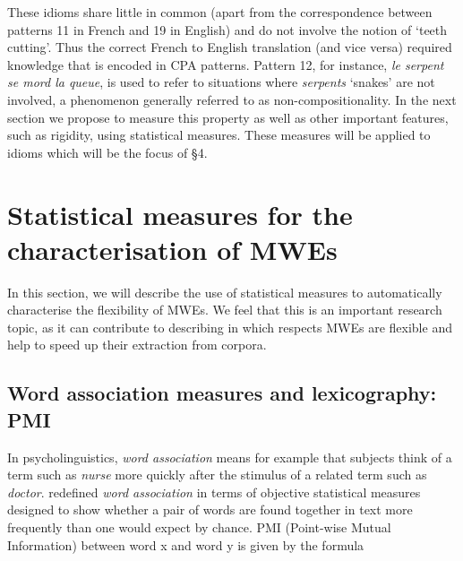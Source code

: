 \documentclass[output=paper]{langsci/langscibook}
\begin{document}
  

These idioms share little in common (apart from the correspondence
between patterns 11 in French and 19 in English) and do not involve the
notion of `teeth cutting'. Thus the correct French to English translation
(and vice versa) required knowledge that is encoded in CPA patterns.
Pattern 12, for instance, \textit{le serpent se mord la queue}, is used to
refer to situations where \textit{serpents} ‘snakes’ are not involved, a
phenomenon generally referred to as non-compositionality. In the next
section we propose to measure this property as well as other important
features, such as rigidity, using statistical measures. These measures
will be applied to idioms which will be the focus of  §4.




\section{Statistical measures for the characterisation of MWEs}

In this section, we will describe the use of statistical measures to
automatically characterise the flexibility  of MWEs. We feel that this
is an important research topic, as it can contribute to describing in
which respects MWEs are flexible and help to speed up their extraction
from corpora.


\subsection{Word association measures and lexicography: PMI}

In psycholinguistics, \textit{word association} means for example that subjects
think of a term such as \textit{nurse} more quickly after the stimulus of a
related term such as \textit{doctor}. \cite{church1989}  redefined \textit{word
association} in terms of objective statistical measures designed to
show whether a pair of words are found together in text more frequently
than one would expect by chance.  PMI (Point-wise Mutual Information)
between word x and word y is given by the formula
 
 
\end{document}
